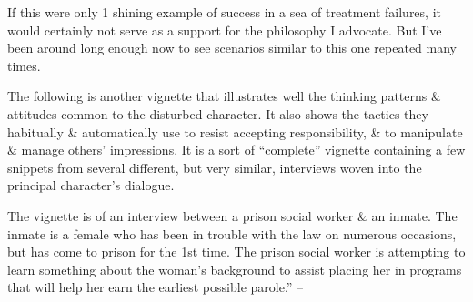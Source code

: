 \documentclass{article}
\numberwithin{equation}{section}
\begin{document}
If this were only 1 shining example of success in a sea of treatment failures, it would certainly not serve as a support for the philosophy I advocate. But I've been around long enough now to see scenarios similar to this one repeated many times.

The following is another vignette that illustrates well the thinking patterns \& attitudes common to the disturbed character. It also shows the tactics they habitually \& automatically use to resist accepting responsibility, \& to manipulate \& manage others' impressions. It is a sort of ``complete'' vignette containing a few snippets from several different, but very similar, interviews woven into the principal character's dialogue.

The vignette is of an interview between a prison social worker \& an inmate. The inmate is a female who has been in trouble with the law on numerous occasions, but has come to prison for the 1st time. The prison social worker is attempting to learn something about the woman's background to assist placing her in programs that will help her earn the earliest possible parole.'' -- \cite[pp. 210--222]{Simon2011}
\end{document}
